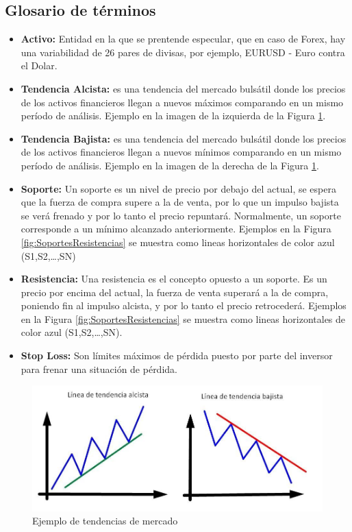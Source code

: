 \subsection{Glosario de términos}
\begin{itemize}
	\item \textbf{Activo:} Entidad en la que se prentende especular, que en caso de Forex, hay una variabilidad de 26 pares de divisas, por ejemplo, EURUSD - Euro contra el Dolar.
	\item \textbf{Tendencia Alcista:} es una tendencia del mercado bulsátil donde los precios de los activos financieros llegan a nuevos máximos comparando en un mismo período de análisis. Ejemplo en la imagen de la izquierda de la Figura \ref{fig:EjemploTentendias}.
	\item \textbf{Tendencia Bajista:} es una tendencia del mercado bulsátil donde los precios de los activos financieros llegan a nuevos mínimos comparando en un mismo período de análisis. Ejemplo en la imagen de la derecha de la Figura \ref{fig:EjemploTentendias}.
	\item \textbf{Soporte:} Un soporte es un nivel de precio por debajo del actual, se espera que la fuerza de compra supere a la de venta, por lo que un impulso bajista se verá frenado y por lo tanto el precio repuntará. Normalmente, un soporte corresponde a un mínimo alcanzado anteriormente. Ejemplos en la Figura \ref{fig:SoportesResistencias} se muestra como lineas horizontales de color azul (S1,S2,\dots,SN)
	\item \textbf{Resistencia:} Una resistencia es el concepto opuesto a un soporte. Es un precio por encima del actual, la fuerza de venta superará a la de compra, poniendo fin al impulso alcista, y por lo tanto el precio retrocederá. Ejemplos en la Figura \ref{fig:SoportesResistencias} se muestra como lineas horizontales de color azul (S1,S2,\dots,SN).
	\item \textbf{Stop Loss:} Son límites máximos de pérdida puesto por parte del inversor para frenar una situación de pérdida.
\end{itemize}

\begin{figure}[H]
	\centering
	\includegraphics[scale=0.45]{imagenes/EjemploTentendias.png}
	\caption{\label{fig:EjemploTentendias}Ejemplo de tendencias de mercado}
\end{figure}


